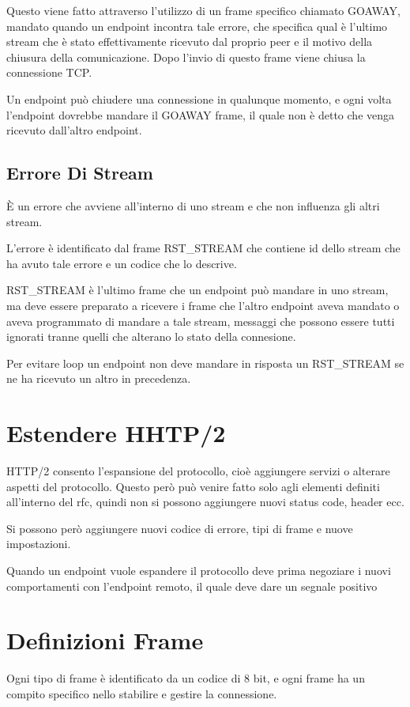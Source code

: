 \documentclass[12pt, a4paper]{article} %
\begin{document}
Questo viene fatto attraverso l'utilizzo di un frame specifico chiamato GOAWAY, mandato quando un endpoint incontra tale errore, che specifica qual è l'ultimo stream che è stato effettivamente ricevuto dal proprio peer e il motivo della chiusura
della comunicazione. Dopo l'invio di questo frame viene chiusa la connessione TCP.

Un endpoint può chiudere una connessione in qualunque momento, e ogni volta l'endpoint dovrebbe mandare il GOAWAY frame, il quale non è detto che venga ricevuto dall'altro endpoint.

\subsection{Errore Di Stream}
\uppercase{è} un errore che avviene all'interno di uno stream e che non influenza gli altri stream.

L'errore è identificato dal frame RST\_STREAM che contiene id dello stream che ha avuto tale errore e un codice che lo descrive.

RST\_STREAM è l'ultimo frame che un endpoint può mandare in uno stream, ma deve essere preparato a ricevere i frame che l'altro endpoint aveva mandato o aveva programmato di mandare a tale stream, messaggi che possono essere tutti ignorati tranne quelli che alterano lo stato della connesione.

Per evitare loop un endpoint non deve mandare in risposta un RST\_STREAM se ne ha ricevuto un altro in precedenza.

\section{Estendere HHTP/2}
HTTP/2 consento l'espansione del protocollo, cioè aggiungere servizi o alterare aspetti del protocollo.
Questo però può venire fatto solo agli elementi definiti all'interno del rfc, quindi non si possono aggiungere nuovi status code, header ecc.

Si possono però aggiungere nuovi codice di errore, tipi di frame e nuove impostazioni.

Quando un endpoint vuole espandere il protocollo deve prima negoziare i nuovi comportamenti con l'endpoint remoto, il quale deve dare un segnale positivo

\section{Definizioni Frame}
Ogni tipo di frame è identificato da un codice di 8 bit, e ogni frame ha un compito specifico nello stabilire e gestire la connessione.
\end{document}
